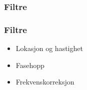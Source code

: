\documentclass[xcolor=table]{beamer}
\begin{document}
\subsubsection{Filtre}
\begin{frame}
  \frametitle{Filtre}
  \begin{itemize}
        \setlength\itemsep{2em}
    \item Lokasjon og hastighet
    \item Fasehopp
    \item Frekvenskorreksjon
  \end{itemize}
\end{frame}
\end{document}
